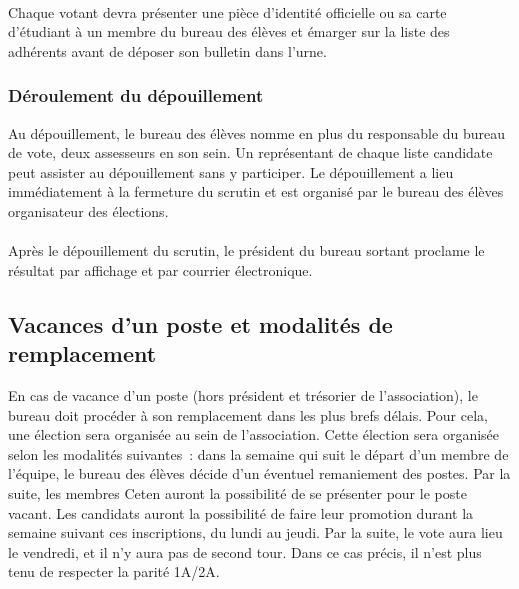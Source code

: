 \documentclass{article} %
\begin{document}
                \paragraph{}
				Chaque votant devra présenter une pièce d’identité officielle ou
				sa carte d’étudiant à un membre du bureau des élèves et émarger
				sur la liste des adhérents avant de déposer son bulletin dans
				l’urne.

			\subsubsection{Déroulement du dépouillement}
\label{ssub:deroulement_du_depouillement}

				Au dépouillement, le bureau des élèves nomme en plus du
				responsable du bureau de vote, deux assesseurs en son sein. Un
				représentant de chaque liste candidate peut assister au
				dépouillement sans y participer. Le dépouillement a lieu
				immédiatement à la fermeture du scrutin et est organisé par le
				bureau des élèves organisateur des élections.

                \paragraph{}
				Après le dépouillement du scrutin, le président du bureau
				sortant proclame le résultat par affichage et par courrier
				électronique.

		\subsection{Vacances d'un poste et modalités de remplacement}
\label{sub:vacances_d_un_poste_et_modalites_de_remplacement}

			En cas de vacance d'un poste (hors président et trésorier de
			l’association), le bureau doit procéder à son remplacement dans les
			plus brefs délais. Pour cela, une élection sera organisée au sein de
			l'association. Cette élection sera organisée selon les modalités
			suivantes : dans la semaine qui suit le départ d’un membre de
			l’équipe, le bureau des élèves décide d’un éventuel remaniement des
			postes. Par la suite, les membres Ceten auront la possibilité de se
			présenter pour le poste vacant. Les candidats auront la possibilité
			de faire leur promotion durant la semaine suivant ces inscriptions,
			du lundi au jeudi. Par la suite, le vote aura lieu le vendredi, et
			il n’y aura pas de second tour. Dans ce cas précis, il n’est plus
			tenu de respecter la parité 1A/2A.
		
\end{document}
